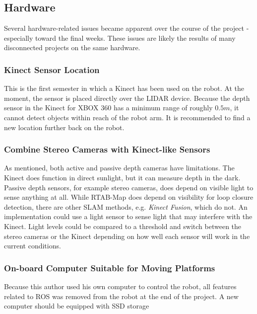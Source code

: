 \subsection{Hardware}

Several hardware-related issues became apparent over the course of the project - especially toward the final weeks. These issues are likely the results of many disconnected projects on the same hardware.

\subsubsection{Kinect Sensor Location}

This is the first semester in which a Kinect has been used on the robot. At the moment, the sensor is placed directly over the \ac{LIDAR} device. Because the depth sensor in the Kinect for XBOX 360 has a minimum range of roughly $0.5 m$, it cannot detect objects within reach of the robot arm. It is recommended to find a new location further back on the robot. 

\subsubsection{Combine Stereo Cameras with Kinect-like Sensors}

As mentioned, both active and passive depth cameras have limitations. The Kinect does function in direct sunlight, but it can measure depth in the dark. Passive depth sensors, for example stereo cameras, does depend on visible light to sense anything at all. While RTAB-Map does depend on visibility for loop closure detection, there are  other \ac{SLAM} methods, e.g. \textit{Kinect Fusion}, which do not. An implementation could use a light sensor to sense light that may interfere with the Kinect. Light levels could be compared to a threshold and switch between the stereo cameras or the Kinect depending on how well each sensor will work in the current conditions. 

\subsubsection{On-board Computer Suitable for Moving Platforms}

Because this author used his own computer to control the robot, all features related to \ac{ROS} was removed from the robot at the end of the project. A new computer should be equipped with \ac{SSD} storage

